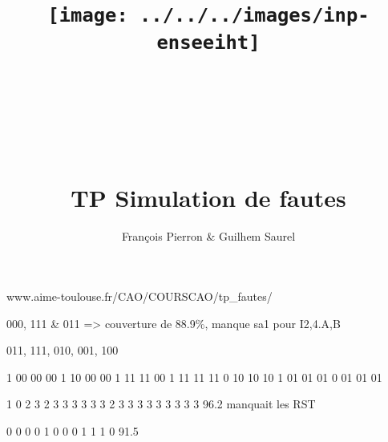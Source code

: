 \documentclass{article}
\title{\texttt{[image: ../../../images/inp-enseeiht]} \\ ~ \\ ~ \\ ~ \\ ~ \\ TP Simulation de fautes}
\author{François Pierron \& Guilhem Saurel}
\date{\oldstylenums{\today}}
\begin{document}
\begin{titlepage}
    \setcounter{page}{0}
    \maketitle
	\tableofcontents
    \thispagestyle{empty}
\end{titlepage}

www.aime-toulouse.fr/CAO/COURSCAO/tp_fautes/

000, 111 \& 011 => couverture de 88.9\%, manque sa1 pour I{2,4}.{A,B}

011, 111, 010, 001, 100

1 00 00 00
1 10 00 00
1 11 11 00
1 11 11 11
0 10 10 10
1 01 01 01
0 01 01 01

1 0 2 3 2 3 3 3 3 3 3 2 3 3 3 3 3 3 3 3 3 
96.2
manquait les RST


0 0 0 0 1 0 0 0 1 1 1 0 91.5
\end{document}
